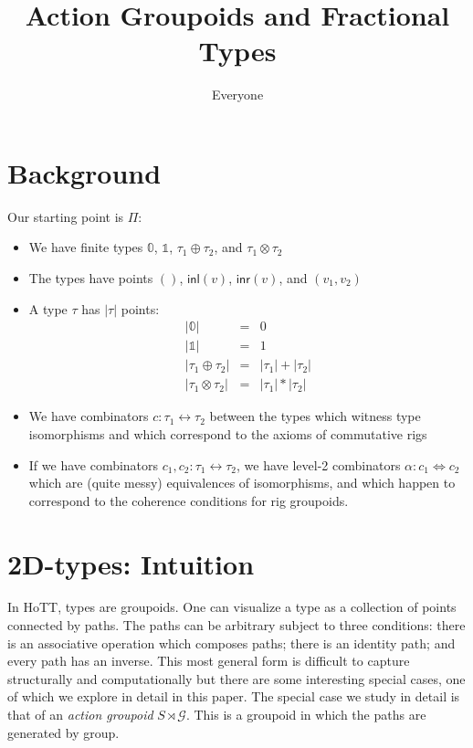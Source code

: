\documentclass{article}
\title{Action Groupoids and Fractional Types}
\author{Everyone}
\newcommand{\inl}[1]{\textsf{inl}(#1)}
\newcommand{\inr}[1]{\textsf{inr}(#1)}
\newcommand{\zt}{\mathbb{0}}
\newcommand{\ot}{\mathbb{1}}
\newcommand{\G}{\mathcal{G}}
\begin{document}
\maketitle 

\section{Background}
 
Our starting point is $\Pi$:
\begin{itemize}
\item We have finite types $\zt$, $\ot$, $\tau_1\oplus\tau_2$, and $\tau_1\otimes\tau_2$
\item The types have points $()$, $\inl{v}$, $\inr{v}$, and $(v_1,v_2)$
\item A type $\tau$ has $|\tau|$ points:
\[\begin{array}{rcl}
|\zt| &=& 0 \\
|\ot| &=& 1 \\
|\tau_1 \oplus \tau_2| &=& |\tau_1| + |\tau_2| \\
|\tau_1 \otimes \tau_2| &=& |\tau_1| * |\tau_2| 
\end{array}\]
\item We have combinators $c : \tau_1\leftrightarrow\tau_2$ between
  the types which witness type isomorphisms and which correspond to
  the axioms of commutative rigs
\item If we have combinators $c_1, c_2 : \tau_1\leftrightarrow\tau_2$,
  we have level-2 combinators $\alpha : c_1 \Leftrightarrow c_2$ which
  are (quite messy) equivalences of isomorphisms, and which happen to
  correspond to the coherence conditions for rig groupoids.
\end{itemize}

\section{2D-types: Intuition}

In HoTT, types are groupoids. One can visualize a type as a collection
of points connected by paths. The paths can be arbitrary subject to
three conditions: there is an associative operation which composes
paths; there is an identity path; and every path has an inverse.  This
most general form is difficult to capture structurally and
computationally but there are some interesting special cases, one of
which we explore in detail in this paper. The special case we study in
detail is that of an \emph{action groupoid} $S \rtimes \G$. This is a
groupoid in which the paths are generated by group.
\end{document}
